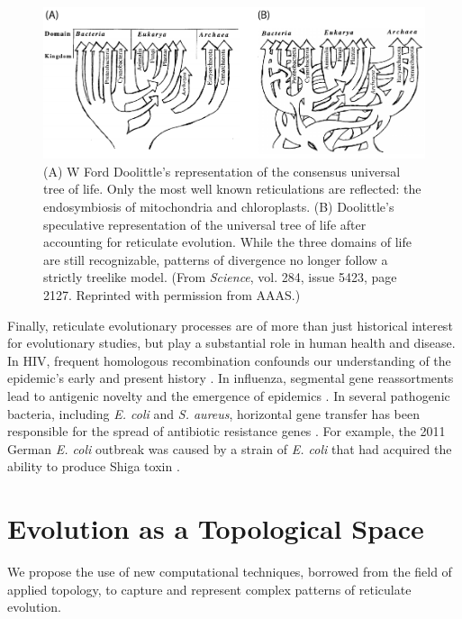 \begin{figure}
\centering
\includegraphics[]{./fig/introduction/doolittle_trees.pdf}
\caption[Ford Doolittle's Reticulate Tree of Life]{(A) W Ford Doolittle's representation of the consensus universal tree of life. Only the most well known reticulations are reflected: the endosymbiosis of mitochondria and chloroplasts. (B) Doolittle's speculative representation of the universal tree of life after accounting for reticulate evolution. While the three domains of life are still recognizable, patterns of divergence no longer follow a strictly treelike model. (From \emph{Science}, vol. 284, issue 5423, page 2127. Reprinted with permission from AAAS.)}
\label{fig:doolittle_tree}
\end{figure}

Finally, reticulate evolutionary processes are of more than just historical interest for evolutionary studies, but play a substantial role in human health and disease.
In HIV, frequent homologous recombination confounds our understanding of the epidemic's early and present history \cite{Burke:1997ep}.
In influenza, segmental gene reassortments lead to antigenic novelty and the emergence of epidemics \cite{Nelson:2007bc}.
In several pathogenic bacteria, including \emph{E. coli} and \emph{S. aureus}, horizontal gene transfer has been responsible for the spread of antibiotic resistance genes \cite{Alekshun:2007bq,Davies:2010dv}.
For example, the 2011 German \emph{E. coli} outbreak was caused by a strain of \emph{E. coli} that had acquired the ability to produce Shiga toxin \cite{Rohde:2011ju}.

\section{Evolution as a Topological Space}

We propose the use of new computational techniques, borrowed from the field of applied topology, to capture and represent complex patterns of reticulate evolution.

